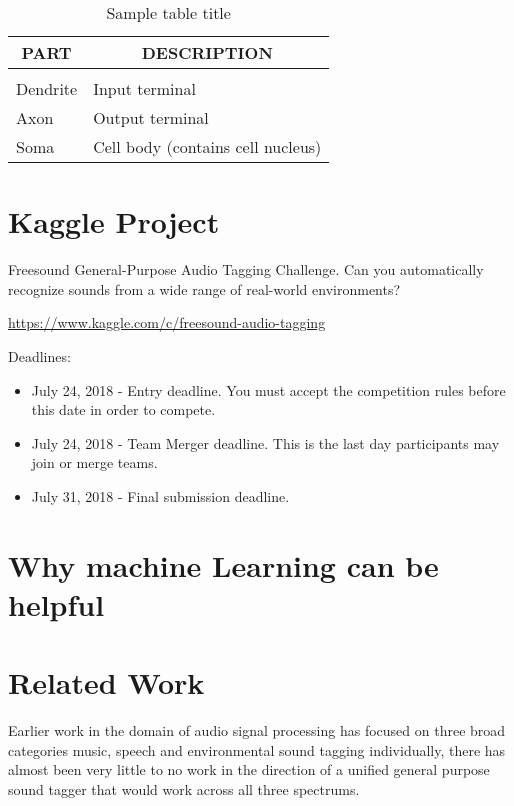 \documentclass{article} %
\begin{document}
	\begin{table}[t]
	\caption{Sample table title}
	\label{sample-table}
	\begin{center}
	\begin{tabular}{ll}
	\multicolumn{1}{c}{\bf PART}  &\multicolumn{1}{c}{\bf DESCRIPTION}
	\\ \hline \\
	Dendrite         &Input terminal \\
	Axon             &Output terminal \\
	Soma             &Cell body (contains cell nucleus) \\
	\end{tabular}
	\end{center}
	\end{table}

\section{Kaggle Project}

	Freesound General-Purpose Audio Tagging Challenge. Can you automatically recognize sounds from a wide range of real-world environments?
	\begin{center}
	   \url{https://www.kaggle.com/c/freesound-audio-tagging}
	\end{center}
	Deadlines:
	\begin{itemize}
	    \item July 24, 2018 - Entry deadline. You must accept the competition rules before this date in order to compete.
	    \item July 24, 2018 - Team Merger deadline. This is the last day participants may join or merge teams.
	    \item July 31, 2018 - Final submission deadline.
	\end{itemize}

\section{Why machine Learning can be helpful}

\section{Related Work}
Earlier work in the domain of audio signal processing has focused on three broad categories music, speech and environmental sound tagging individually, there has almost been very little to no work in the direction of a unified general purpose sound tagger that would work across all three spectrums.
 
\end{document}
